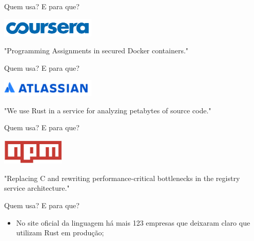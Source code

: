 \documentclass[aspectratio=169]{beamer}
\begin{document}
\begin{frame}{Quem usa? E para que?}
	\begin{center}
		\includegraphics[width=4.5cm]{imgs/coursera.png}	
		
		"Programming Assignments in secured Docker containers."
	\end{center}
\end{frame}

\begin{frame}{Quem usa? E para que?}
	\begin{center}
		\includegraphics[width=4.5cm]{imgs/atlassian.png}	
		
		"We use Rust in a service for analyzing petabytes of source code."
	\end{center}
\end{frame}

\begin{frame}{Quem usa? E para que?}
	\begin{center}
		\includegraphics[width=3.0cm]{imgs/npm.jpeg}	
		
		"Replacing C and rewriting performance-critical bottlenecks in the registry service architecture."
	\end{center}
\end{frame}

\begin{frame}{Quem usa? E para que?}
	\begin{itemize}
		\item No site oficial da linguagem há mais 123 empresas que deixaram claro que utilizam Rust em produção;
	\end{itemize}
\end{frame}
\end{document}
